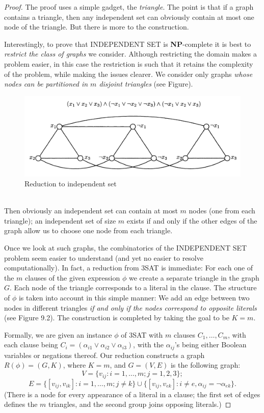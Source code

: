 \documentclass[12pt]{article}
\begin{document}
\begin{proof}
  The proof uses a simple gadget, the \textit{triangle}. The point is that if a graph contains a triangle, then any independent set can obviously contain at most one node of the triangle. But there is more to the construction.

Interestingly, to prove that \textsc{INDEPENDENT SET} is \textbf{NP}-complete it is best to \textit{restrict the class of graphs} we consider. Although restricting the domain makes a problem easier, in this case the restriction is such that it retains the complexity of the problem, while making the issues clearer. We consider only graphs \textit{whose nodes can be partitioned in $m$ disjoint triangles} (see Figure).
\begin{figure}[h]
  \centering
  \includegraphics[width=1\textwidth]{img/independent_set.png}
  \caption{Reduction to independent set}
\end{figure}
\\
Then obviously an independent set can contain at most $m$ nodes (one from each triangle); an independent set of size $m$ exists if and only if the other edges of the graph allow us to choose one node from each triangle.

Once we look at such graphs, the combinatorics of the \textsc{INDEPENDENT SET} problem seem easier to understand (and yet no easier to resolve computationally). In fact, a reduction from \textsc{3SAT} is immediate: For each one of the $m$ clauses of the given expression $\phi$ we create a separate triangle in the graph $G$. Each node of the triangle corresponds to a literal in the clause. The structure of $\phi$ is taken into account in this simple manner: We add an edge between two nodes in different triangles \textit{if and only if the nodes correspond to opposite literals} (see Figure 9.2). The construction is completed by taking the goal to be $K = m$.

Formally, we are given an instance $\phi$ of \textsc{3SAT} with $m$ clauses $C_1, \ldots, C_m$, with each clause being $C_i = (\alpha_{i1} \vee \alpha_{i2} \vee \alpha_{i3})$, with the $\alpha_{ij}$'s being either Boolean variables or negations thereof. Our reduction constructs a graph $R(\phi) = (G, K)$, where $K = m$, and $G = (V, E)$ is the following graph: 
\[
V = \{v_{ij} : i = 1, \ldots, m; j = 1, 2, 3\}; 
 \]
 \[ E = \{[v_{ij}, v_{ik}] : i = 1, \ldots, m; j \neq k\} \cup \{[v_{ij}, v_{ek}] : i \neq e, \alpha_{ij} = \neg \alpha_{ek}\}.
\]
(There is a node for every appearance of a literal in a clause; the first set of edges defines the $m$ triangles, and the second group joins opposing literals.)


\end{proof}
\end{document}
